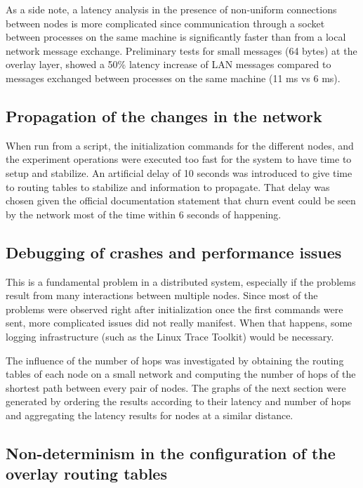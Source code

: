 As a side note, a latency analysis in the presence of non-uniform connections between nodes is more complicated since communication through a socket between processes on the same machine is significantly faster than from a local network message exchange. Preliminary tests for small messages (64 bytes) at the overlay layer, showed a 50\% latency increase of LAN messages compared to messages exchanged between processes on the same machine (11 ms vs 6 ms).

\subsection{Propagation of the changes in the network}

When run from a script, the initialization commands for the different nodes, and the experiment operations were executed too fast for the system to have time to setup and stabilize.  An artificial delay of 10 seconds was introduced to give time to routing tables to stabilize and information to propagate. That delay was chosen given the official documentation statement that churn event could be seen by the network most of the time within 6 seconds of happening.

\subsection{Debugging of crashes and performance issues}

This is a fundamental problem in a distributed system, especially if the problems result from many interactions between multiple nodes. Since most of the problems were observed right after initialization once the first commands were sent, more complicated issues did not really manifest. When that happens, some logging infrastructure (such as the Linux Trace Toolkit) would be necessary.

The influence of the number of hops was investigated by obtaining the routing tables of each node on a small network and computing the number of hops of the shortest path between every pair of nodes. The graphs of the next section were generated by ordering the results according to their latency and number of hops and aggregating the latency results for nodes at a similar distance.

\subsection{Non-determinism in the configuration of the overlay routing tables}

